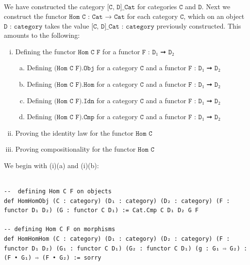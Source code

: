 \documentclass{book}
\newcounter{lcounter}
\newcounter{sectioncount}
\newcounter{subsectioncount}
\renewcommand{\section}[1]{\newpage
\ \\
\ \\
 \begin{center} \scalebox{1.5}{\texttt{\thesectioncount . #1}} \setcounter{sectioncount}{\thesectioncount+1} \setcounter{subsectioncount}{1} \end{center}
 \begin{center}

\ \\
\ \\

\thispagestyle{empty}
\end{center}
}
\begin{document}
\section{\texttt{Hom C : Cat ➞ Cat}}

We have constructed the category $\texttt{[C, D]\_Cat}$ for categories $\texttt{C}$ and $\texttt{D}$. Next we construct the functor $\texttt{Hom C : Cat → Cat}$ for each category $\texttt{C}$, which on an object $\texttt{D : category}$ takes the value $\texttt{[C, D]_Cat : category}$ previously constructed. This amounts to the following:

\begin{enumerate}[(i)]
\item Defining the functor $\texttt{Hom C F}$ for a functor $\texttt{F : D₁ ➞ D₂}$
\begin{enumerate}[(a)]
\item Defining $\texttt{(Hom C F).Obj}$ for a category $\texttt{C}$ and a functor $\texttt{F : D₁ ➞ D₂}$
\item Defining $\texttt{(Hom C F).Hom}$ for a category $\texttt{C}$ and a functor $\texttt{F : D₁ ➞ D₂}$
\item Defining $\texttt{(Hom C F).Idn}$ for a category $\texttt{C}$ and a functor $\texttt{F : D₁ ➞ D₂}$
\item Defining $\texttt{(Hom C F).Cmp}$ for a category $\texttt{C}$ and a functor $\texttt{F : D₁ ➞ D₂}$
\end{enumerate}
\item Proving the identity law for the functor $\texttt{Hom C}$
\item Proving compositionality for the functor $\texttt{Hom C}$
\end{enumerate}

We begin with (i)(a) and (i)(b):

\begin{center}
\begin{tcolorbox}[width=5in,colback={white},title={\begin{center}\texttt{Lean \thelcounter} \addtocounter{lcounter}{1}  \end{center}},colbacktitle=Blue,coltitle=black]
\begin{verbatim}

--  defining Hom C F on objects
def HomHomObj (C : category) (D₁ : category) (D₂ : category) (F : functor D₁ D₂) (G : functor C D₁) := Cat.Cmp C D₁ D₂ G F

-- defining Hom C F on morphisms
def HomHomHom (C : category) (D₁ : category) (D₂ : category) (F : functor D₁ D₂) (G₁ : functor C D₁) (G₂ : functor C D₁) (g : G₁ ⇨ G₂) : (F • G₁) ⇨ (F • G₂) := sorry

\end{verbatim}%
\end{tcolorbox}
\end{center}
\end{document}

